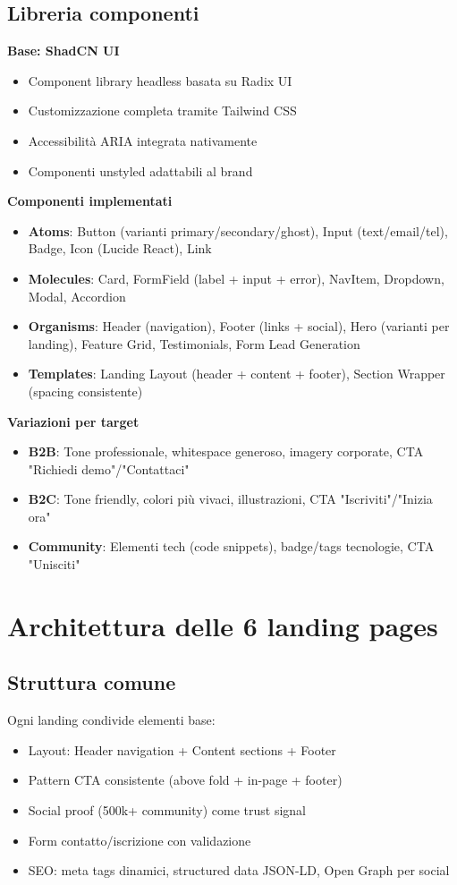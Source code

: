 \subsection{Libreria componenti}
\textbf{Base: ShadCN UI}
\begin{itemize}
  \item Component library headless basata su Radix UI
  \item Customizzazione completa tramite Tailwind CSS
  \item Accessibilità ARIA integrata nativamente
  \item Componenti unstyled adattabili al brand
\end{itemize}

\textbf{Componenti implementati}
\begin{itemize}
  \item \textbf{Atoms}: Button (varianti primary/secondary/ghost), 
        Input (text/email/tel), Badge, Icon (Lucide React), Link
  \item \textbf{Molecules}: Card, FormField (label + input + error), 
        NavItem, Dropdown, Modal, Accordion
  \item \textbf{Organisms}: Header (navigation), Footer (links + social), 
        Hero (varianti per landing), Feature Grid, Testimonials, 
        Form Lead Generation
  \item \textbf{Templates}: Landing Layout (header + content + footer), 
        Section Wrapper (spacing consistente)
\end{itemize}

\textbf{Variazioni per target}
\begin{itemize}
  \item \textbf{B2B}: Tone professionale, whitespace generoso, imagery 
        corporate, CTA "Richiedi demo"/"Contattaci"
  \item \textbf{B2C}: Tone friendly, colori più vivaci, illustrazioni, 
        CTA "Iscriviti"/"Inizia ora"
  \item \textbf{Community}: Elementi tech (code snippets), 
        badge/tags tecnologie, CTA "Unisciti"
\end{itemize}

\section{Architettura delle 6 landing pages}
\subsection{Struttura comune}
Ogni landing condivide elementi base:
\begin{itemize}
  \item Layout: Header navigation + Content sections + Footer
  \item Pattern CTA consistente (above fold + in-page + footer)
  \item Social proof (500k+ community) come trust signal
  \item Form contatto/iscrizione con validazione
  \item SEO: meta tags dinamici, structured data JSON-LD, 
        Open Graph per social
\end{itemize}

